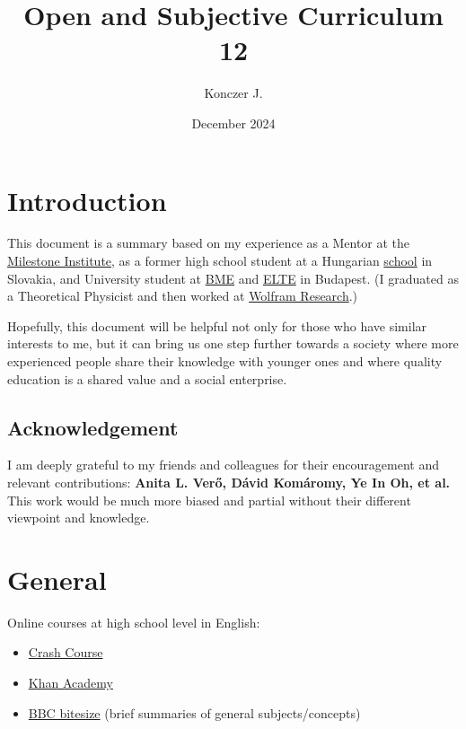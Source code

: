 \documentclass{article}
\title{Open and Subjective Curriculum \\ 12}
\author{Konczer J.}
\date{December 2024}
\begin{document}
\maketitle

\section*{}

\section{Introduction}

This document is a summary based on my experience as a Mentor at the \href{https://milestone-institute.org/}{Milestone Institute}, as a former high school student at a Hungarian \href{http://selye.gartproject.com/}{school} in Slovakia, and University student at \href{https://www.bme.hu/?language=en}{BME} and \href{https://www.elte.hu/en/}{ELTE} in Budapest.
(I graduated as a Theoretical Physicist and then worked at \href{https://www.wolfram.com/}{Wolfram Research}.)

Hopefully, this document will be helpful not only for those who have similar interests to me, but it can bring us one step further towards a society where more experienced people share their knowledge with younger ones and where quality education is a shared value and a social enterprise.

\subsection{Acknowledgement}

I am deeply grateful to my friends and colleagues for their encouragement and relevant contributions:
{\bf
Anita L. Verő,
Dávid Komáromy,
Ye In Oh,
et al.
}
This work would be much more biased and partial without their different viewpoint and knowledge.

\section{General}

Online courses at high school level in English:
\begin{itemize}
\item \href{https://thecrashcourse.com/}{Crash Course}
\item \href{https://www.khanacademy.org/}{Khan Academy}
\item \href{https://www.bbc.co.uk/bitesize/levels/z98jmp3}{BBC bitesize} (brief summaries of general subjects/concepts)
\end{itemize}
\end{document}
